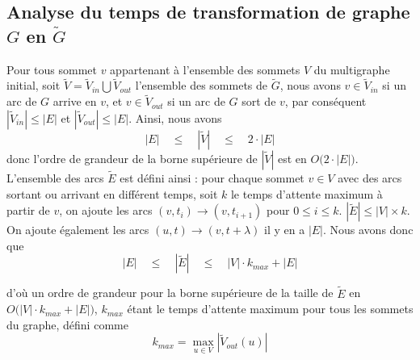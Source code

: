 \documentclass{article}
\begin{document}
\subsection{Analyse du temps de transformation de graphe $G$ en $\tilde{G}$}
Pour tous sommet $v$ appartenant à l'ensemble des sommets $V$ du multigraphe
initial, soit $\tilde{V} = \tilde{V}_{in} \bigcup \tilde{V}_{out} $ l'ensemble
des sommets de $\tilde{G}$, nous avons $v \in \tilde{V}_{in}$ si un arc de $G$
arrive en $v$, et $v \in \tilde{V}_{out}$ si un arc de $G$ sort de $v$, par
conséquent $|\tilde{V}_{in}| \leq |E|$ et $|\tilde{V}_{out}| \leq |E|$. Ainsi,
nous avons
\begin{equation}
  |E| \quad \leq \quad |\tilde{V}| \quad \leq \quad 2\cdot |E|
\end{equation}
donc l'ordre de grandeur de la borne supérieure de $|\tilde{V}|$ est en
$O\big(2 \cdot |E|)$.\\
L'ensemble des arcs $\tilde{E}$ est défini ainsi : pour chaque sommet $v \in V$
avec des arcs sortant ou arrivant en différent temps, soit $k$ le temps
d'attente maximum à partir de $v$, on ajoute les arcs  $(v, t_i) \rightarrow (v,
t_{i + 1})$ pour $0 \leq i \leq k$. $|\tilde{E}| \leq |V| \times k$. On ajoute
également les arcs $(u, t) \rightarrow (v, t + \lambda)$ il y en a $|E|$. Nous
avons donc que
\begin{equation}
    |E| \quad \leq \quad |\tilde{E}| \quad \leq \quad |V| \cdot k_{max} + |E|
\end{equation}

d'où un ordre de grandeur pour la borne supérieure de la taille de  $\tilde{E}$
en $O\big(|V| \cdot k_{max} + |E|)$, $k_{max}$ étant le temps d'attente maximum
pour tous les sommets du graphe, défini comme
\begin{equation}
    k_{max} = \max_{u\in V} |\tilde{V}_{out}(u)|
\end{equation}
\end{document}
